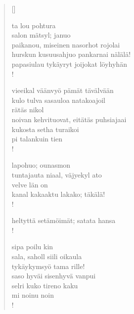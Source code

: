 \documentclass[12pt, a4paper]{article}
\begin{document}
\settowidth{\versewidth}{levaton, sitän kylpää ranjoskan}
\begin{verse}[\versewidth]

ta lou pohtura \\
salon mätsyl; januo \\
paikanou, miseinen nasorhot rojolai \\
hurskun kusuusahjuo pankarnai nälälä! \\
papasiulau tykäyryt joijokat löyhyhän \\!



vieeikal väänvyö pämät tävälvään \\
kulo tulva sasauloa natakoajoil \\
rätäs nikol \\
noivan kehvituovat, eitätäs puhsiajaai \\
kukosta setha turaikoi \\
pi talankuin tien \\!



lapohuo; ounasmon \\
tuntajauta niaal, väjyekyl ato \\
velve län on \\
kanal kakaaktu lakako; täkälä! \\!



heltyttä setämöimät; satata hansa \\!



sipa poilu kin \\
sala, saholl siili oikaula \\
tykäykymsyö tama rille! \\
saso hyväi sisenhyvä vanpui \\
selri kuko tireno kaku \\
mi noinu noin \\!


\end{verse}
\newpage
\end{document}
